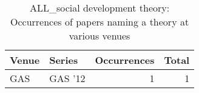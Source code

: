 \begin{table*}[t]
\begin{tabular}{llrr}
Venue & Series & Occurrences & Total\\\hline
\multirow{1}{*}{GAS } & GAS '12 & 1 & \multirow{1}{*}{1}\\
\end{tabular}
\caption{ALL\_social development theory: Occurrences of papers naming a theory at various venues}
\end{table*}